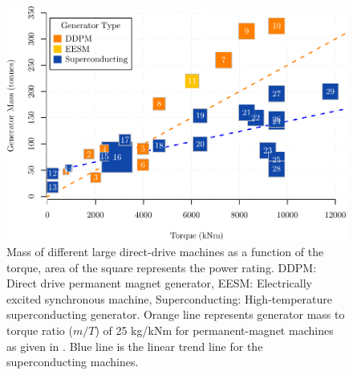 \documentclass[12pt]{iopart}
\begin{document}
\begin{figure}[]
\centering
\includegraphics[]{generator_mass_compare}
\caption{Mass of different large direct-drive machines as a function of the torque, area of the square represents the power rating.
 DDPM: Direct drive permanent magnet generator, EESM: Electrically excited synchronous machine, Superconducting: High-temperature superconducting generator. Orange line represents generator mass to torque ratio ($m/T$) of 25 kg/kNm for permanent-magnet machines as given in \cite{Bang2008}. Blue line is the linear trend line for the superconducting machines.}
\label{generators_mass_comparison}
\end{figure}
\end{document}
